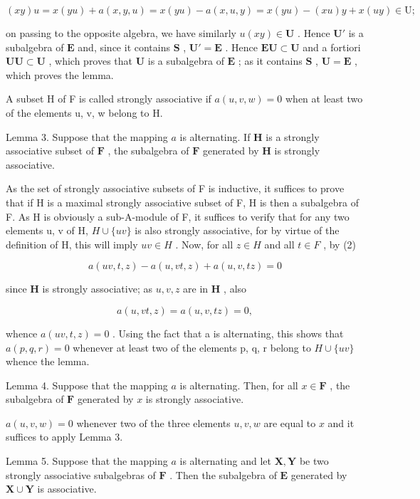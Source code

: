 \[
(x y) u = x (y u) + a (x, y, u) = x (y u) - a (x, u, y) = x (y u) - (x u) y + x (u y) \in \mathrm{U};
\]

on passing to the opposite algebra, we have similarly \(u(xy) \in \mathbf{U}\) . Hence \(\mathbf{U}'\) is a subalgebra of \(\mathbf{E}\) and, since it contains \(\mathbf{S}\) , \(\mathbf{U}' = \mathbf{E}\) . Hence \(\mathbf{EU} \subset \mathbf{U}\) and a fortiori \(\mathbf{UU} \subset \mathbf{U}\) , which proves that \(\mathbf{U}\) is a subalgebra of \(\mathbf{E}\) ; as it contains \(\mathbf{S}\) , \(\mathbf{U} = \mathbf{E}\) , which proves the lemma.

A subset H of F is called strongly associative if \(a(u, v, w) = 0\) when at least two of the elements u, v, w belong to H.

Lemma 3. Suppose that the mapping \(a\) is alternating. If \(\mathbf{H}\) is a strongly associative subset of \(\mathbf{F}\) , the subalgebra of \(\mathbf{F}\) generated by \(\mathbf{H}\) is strongly associative.

As the set of strongly associative subsets of F is inductive, it suffices to prove that if H is a maximal strongly associative subset of F, H is then a subalgebra of F. As H is obviously a sub-A-module of F, it suffices to verify that for any two elements u, v of H, \(H \cup \{uv\}\) is also strongly associative, for by virtue of the definition of H, this will imply \(uv \in H\) . Now, for all \(z \in H\) and all \(t \in F\) , by (2)

\[
a (u v, t, z) - a (u, v t, z) + a (u, v, t z) = 0
\]

since \(\mathbf{H}\) is strongly associative; as \(u, v, z\) are in \(\mathbf{H}\) , also

\[
a (u, v t, z) = a (u, v, t z) = 0,
\]

whence \(a(uv, t, z) = 0\) . Using the fact that a is alternating, this shows that \(a(p, q, r) = 0\) whenever at least two of the elements p, q, r belong to \(H \cup \{uv\}\) whence the lemma.

Lemma 4. Suppose that the mapping \(a\) is alternating. Then, for all \(x \in \mathbf{F}\) , the subalgebra of \(\mathbf{F}\) generated by \(x\) is strongly associative.

\(a(u,v,w) = 0\) whenever two of the three elements \(u, v, w\) are equal to \(x\) and it suffices to apply Lemma 3.

Lemma 5. Suppose that the mapping \(a\) is alternating and let \(\mathbf{X}, \mathbf{Y}\) be two strongly associative subalgebras of \(\mathbf{F}\) . Then the subalgebra of \(\mathbf{E}\) generated by \(\mathbf{X} \cup \mathbf{Y}\) is associative.


